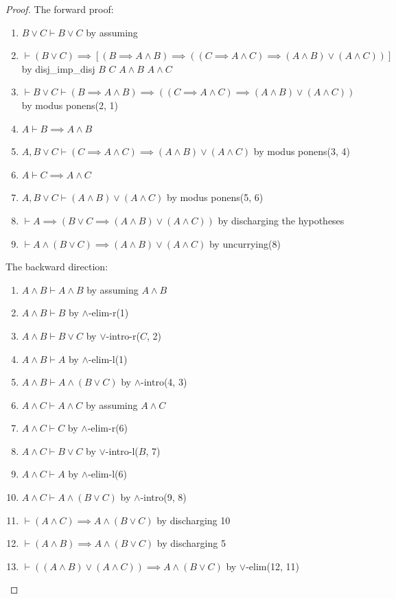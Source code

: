 \begin{proof}
The forward proof:
\begin{enumerate}
\item $B\lor C\vdash B\lor C$ by assuming
\item $\vdash (B\lor C)\implies[(B\implies A\land B)\implies((C\implies A\land C)\implies(A\land B)\lor(A\land C))]$
  by {\Tt{}disj{\_}imp{\_}disj\nwendquote} $B$ $C$ $A\land B$ $A\land C$
\item $\vdash B\lor C\vdash(B\implies A\land B)\implies((C\implies A\land C)\implies(A\land B)\lor(A\land C))$
  by modus ponens(2, 1)%
\item $A\vdash B\implies A\land B$%
\item $A, B\lor C\vdash(C\implies A\land C)\implies(A\land B)\lor(A\land C)$
  by modus ponens(3, 4)%
\item $A\vdash C\implies A\land C$%
\item $A, B\lor C\vdash(A\land B)\lor(A\land C)$
  by modus ponens(5, 6)%
\item $\vdash A\implies(B\lor C\implies(A\land B)\lor(A\land C))$
  by discharging the hypotheses%
\item $\vdash A\land(B\lor C)\implies(A\land B)\lor(A\land C)$
  by uncurrying(8)%
\end{enumerate}
The backward direction:
\begin{enumerate}
\item $A\land B\vdash A\land B$ by assuming $A\land B$%
\item $A\land B\vdash B$ by $\land$-elim-r(1)%
\item $A\land B\vdash B\lor C$ by $\lor$-intro-r($C$, 2)%
\item $A\land B\vdash A$ by $\land$-elim-l(1)%
\item $A\land B\vdash A\land(B\lor C)$ by $\land$-intro(4, 3)%
\item $A\land C\vdash A\land C$ by assuming $A\land C$%
\item $A\land C\vdash C$ by $\land$-elim-r(6)%
\item $A\land C\vdash B\lor C$ by $\lor$-intro-l($B$, 7)%
\item $A\land C\vdash A$ by $\land$-elim-l(6)%
\item $A\land C\vdash A\land(B\lor C)$ by $\land$-intro(9, 8)%
\item $\vdash(A\land C)\implies A\land(B\lor C)$ by discharging 10
\item $\vdash(A\land B)\implies A\land(B\lor C)$ by discharging 5
\item $\vdash((A\land B)\lor(A\land C))\implies A\land(B\lor C)$ by
  $\lor$-elim(12, 11)
\qedhere
\end{enumerate}
\end{proof}

